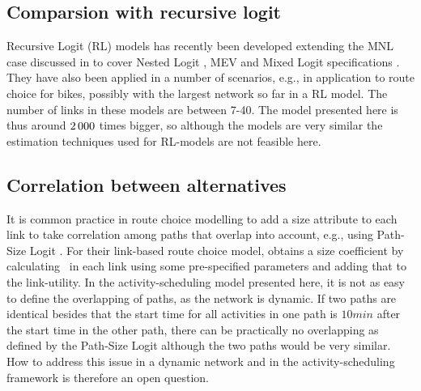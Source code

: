 \subsection{Comparsion with recursive logit}
Recursive Logit (RL) models has recently been developed extending the MNL case discussed in \citet{fosgerau2013} to cover Nested Logit \citep{mai2015}, MEV \citep{mai2016method} and Mixed Logit specifications \citep{mai2016decomposition}. They have also been applied in a number of scenarios, e.g., in \cite{zimmermann2017bike}  application to route choice for bikes, possibly with the largest network so far in a RL model. The number of links in these models are between 7-40. The model presented here is thus around $2\, 000$ times bigger, so although the models are very similar the estimation techniques used for RL-models are not feasible here. 

\subsection{Correlation between alternatives}
It is common practice in route choice modelling to add a size attribute to each link to take correlation among paths that overlap into account, e.g., using Path-Size Logit \citep{BenAkivaBier99}. For their link-based route choice model, \citet{fosgerau11} obtains a size coefficient by calculating \eutil\, in each link using some pre-specified parameters and adding that to the link-utility. In the activity-scheduling model presented here, it is not as easy to define the overlapping of paths, as the network is dynamic. If two paths are identical besides that the start time for all activities in one path is $10\unit{min}$ after the start time in the other path, there can be practically no overlapping as defined by the Path-Size Logit although the two paths would be very similar. How to address this issue in a dynamic network and in the activity-scheduling framework is therefore an open question.

